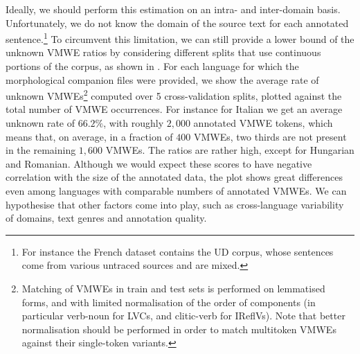 \documentclass[output=paper,modfonts]{langscibook}
\begin{document}
Ideally, we should perform this estimation on an intra- and inter-domain basis. 
Unfortunately, we do not know the domain of the source text for each annotated sentence.\footnote{For instance the French dataset contains the UD corpus, whose sentences come from various untraced sources and are mixed.} To circumvent this limitation, we can still provide a lower bound of the unknown VMWE ratios by considering different splits that use continuous portions of the corpus, as shown in . For each language for which the morphological companion files were provided,
we show the average rate of unknown %
VMWEs\footnote{Matching of VMWEs in train and test sets is performed on lemmatised forms, and with limited normalisation of the order of components (in particular verb-noun for LVCs, and clitic-verb for IReflVs). Note that better normalisation should be performed in order to match multitoken VMWEs against their single-token variants.} computed over 5 cross-validation splits, plotted against the total number of VMWE occurrences. For instance for Italian we get an average unknown rate of $66.2\%$, with roughly $2{,}000$ annotated VMWE tokens, which means that, on average, in a fraction of $400$ VMWEs, two thirds are not present in the remaining $1{,}600$ VMWEs. %
The ratios are rather high, except for Hungarian and Romanian. Although we would expect these scores to have negative correlation with the size of the annotated data, the plot shows great differences even among languages with comparable numbers of annotated VMWEs. We can hypothesise that other factors come into play, such as cross-language variability of domains, text genres and annotation quality.  
\end{document}
